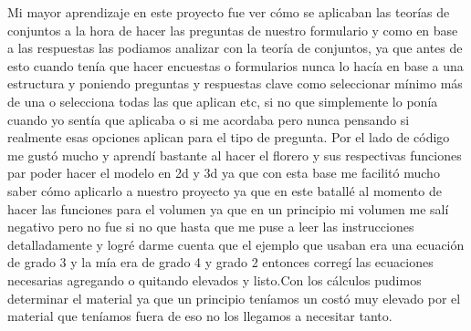
\tab Mi mayor aprendizaje en este proyecto fue ver cómo se aplicaban las teorías de conjuntos a la hora de hacer las preguntas de nuestro formulario y como en base a las respuestas las podiamos analizar con la teoría de conjuntos, ya que antes de esto cuando tenía que hacer encuestas o formularios nunca lo hacía en base a una estructura y poniendo preguntas y respuestas clave como seleccionar mínimo más de una o selecciona todas las que aplican etc, si no que simplemente lo ponía cuando yo sentía que aplicaba o si me acordaba pero nunca pensando si realmente esas opciones aplican para el tipo de pregunta. Por el lado de código me gustó mucho y aprendí bastante al hacer el florero y sus respectivas funciones par poder hacer el modelo en 2d y 3d ya que con esta base me facilitó mucho saber cómo aplicarlo a nuestro proyecto ya que en este batallé al momento de hacer las funciones para el volumen ya que en un principio mi volumen me salí negativo pero no fue si no que hasta que me puse a leer las instrucciones detalladamente y logré darme cuenta que el ejemplo que usaban era una ecuación de grado 3 y la mía era de grado 4  y grado 2 entonces corregí las ecuaciones necesarias agregando o quitando elevados y listo.Con los cálculos pudimos determinar el material ya que un principio teníamos un costó muy elevado por el material que teníamos fuera de eso no los llegamos a necesitar tanto.
